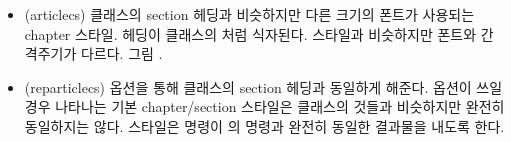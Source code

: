 \begin{itemize}
\item[\cstyle{article}]
\glossary(articlecs)%
  {}%
  { 클래스의 section 헤딩과 비슷하지만 다른 크기의 폰트가 사용되는 chapter 스타일.}
헤딩이  클래스의 \cmd{\section}처럼 식자된다.
 스타일과 비슷하지만 폰트와 간격주기가 다르다. 그림 .

\item[\cstyle{reparticle}]
\glossary(reparticlecs)%
  {}%
  { 옵션을 통해  클래스의 section 헤딩과 동일하게 해준다.
  }
	 옵션이 쓰일 경우 
	나타나는 기본 chapter/section 스타일은
	 클래스의 것들과 비슷하지만
	완전히 동일하지는 않다. 
	 스타일은 \cmd{\chapter} 명령이
	의 \cmd{\section} 명령과 완전히 동일한
	결과물을 내도록 한다.

\end{itemize}

